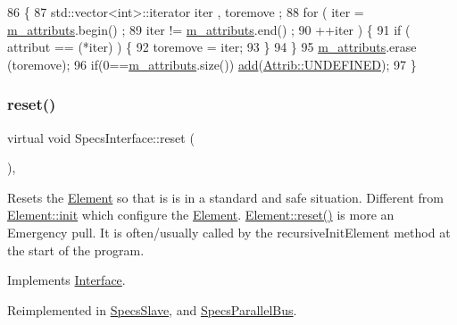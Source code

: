 \begin{DoxyCode}
86                                \{
87     std::vector<int>::iterator iter , toremove ;
88     \textcolor{keywordflow}{for} ( iter  = \hyperlink{classAttrib_ac4bd58a0cc6b38a3b711d609a3d3aacc}{m\_attributs}.begin() ;
89           iter != \hyperlink{classAttrib_ac4bd58a0cc6b38a3b711d609a3d3aacc}{m\_attributs}.end()   ;
90           ++iter ) \{
91       \textcolor{keywordflow}{if} ( attribut == (*iter) ) \{
92         toremove = iter;
93       \}
94     \}
95     \hyperlink{classAttrib_ac4bd58a0cc6b38a3b711d609a3d3aacc}{m\_attributs}.erase (toremove);
96     \textcolor{keywordflow}{if}(0==\hyperlink{classAttrib_ac4bd58a0cc6b38a3b711d609a3d3aacc}{m\_attributs}.size()) \hyperlink{classAttrib_a235f773af19c900264a190b00a3b4ad7}{add}(\hyperlink{classAttrib_a69e171d7cc6417835a5a306d3c764235a3a8da2ab97dda18aebab196fe4100531}{Attrib::UNDEFINED});
97   \}
\end{DoxyCode}
\mbox{\label{classSpecsInterface_ade474eeef32f10c72926c9ba7d23f9a8}} 
\subsubsection{\texorpdfstring{reset()}{reset()}}
{\footnotesize\ttfamily virtual void Specs\+Interface\+::reset (\begin{DoxyParamCaption}{ }\end{DoxyParamCaption})\hspace{0.3cm}{\ttfamily [inline]}, {\ttfamily [virtual]}}

Resets the \hyperlink{classElement}{Element} so that is is in a standard and safe situation. Different from \hyperlink{classElement_af42754b5cabc198869222725218d695c}{Element\+::init} which configure the \hyperlink{classElement}{Element}. \hyperlink{classElement_a69efffa22f06909d768149715565cb56}{Element\+::reset()} is more an Emergency pull. It is often/usually called by the recursive\+Init\+Element method at the start of the program. 

Implements \hyperlink{classInterface_a4d44329cea9981a9e0392eaaf99efadd}{Interface}.



Reimplemented in \hyperlink{classSpecsSlave_a6c69baff5941cabed2947f547041bbeb}{Specs\+Slave}, and \hyperlink{classSpecsParallelBus_af8e41f6efecc8d65cf7d7a884a33d4ee}{Specs\+Parallel\+Bus}.



